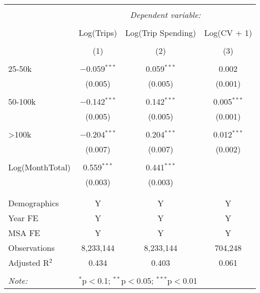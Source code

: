 
\begin{table}[!htbp] \centering 
  \caption{} 
  \label{} 
\begin{tabular}{@{\extracolsep{5pt}}lccc} 
\\[-1.8ex]\hline 
\hline \\[-1.8ex] 
 & \multicolumn{3}{c}{\textit{Dependent variable:}} \\ 
\cline{2-4} 
\\[-1.8ex] & Log(Trips) & Log(Trip Spending) & Log(CV + 1) \\ 
\\[-1.8ex] & (1) & (2) & (3)\\ 
\hline \\[-1.8ex] 
 25-50k & $-$0.059$^{***}$ & 0.059$^{***}$ & 0.002 \\ 
  & (0.005) & (0.005) & (0.001) \\ 
  & & & \\ 
 50-100k & $-$0.142$^{***}$ & 0.142$^{***}$ & 0.005$^{***}$ \\ 
  & (0.005) & (0.005) & (0.001) \\ 
  & & & \\ 
 >100k & $-$0.204$^{***}$ & 0.204$^{***}$ & 0.012$^{***}$ \\ 
  & (0.007) & (0.007) & (0.002) \\ 
  & & & \\ 
 Log(MonthTotal) & 0.559$^{***}$ & 0.441$^{***}$ &  \\ 
  & (0.003) & (0.003) &  \\ 
  & & & \\ 
\hline \\[-1.8ex] 
Demographics & Y & Y & Y \\ 
Year FE & Y & Y & Y \\ 
MSA FE & Y & Y & Y \\ 
Observations & 8,233,144 & 8,233,144 & 704,248 \\ 
Adjusted R$^{2}$ & 0.434 & 0.403 & 0.061 \\ 
\hline 
\hline \\[-1.8ex] 
\textit{Note:}  & \multicolumn{3}{l}{$^{*}$p$<$0.1; $^{**}$p$<$0.05; $^{***}$p$<$0.01} \\ 
\end{tabular} 
\end{table} 
